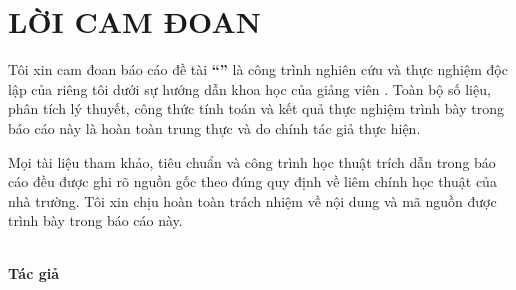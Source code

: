 \chapter*{LỜI CAM ĐOAN}

Tôi xin cam đoan báo cáo đề tài \textbf{``\ProjectTitle''} là công trình nghiên cứu và thực nghiệm độc lập của riêng tôi dưới sự hướng dẫn khoa học của giảng viên \textbf{\InstructorName}. Toàn bộ số liệu, phân tích lý thuyết, công thức tính toán và kết quả thực nghiệm trình bày trong báo cáo này là hoàn toàn trung thực và do chính tác giả thực hiện.

Mọi tài liệu tham khảo, tiêu chuẩn và công trình học thuật trích dẫn trong báo cáo đều được ghi rõ nguồn gốc theo đúng quy định về liêm chính học thuật của nhà trường. Tôi xin chịu hoàn toàn trách nhiệm về nội dung và mã nguồn được trình bày trong báo cáo này.

\vspace{1.5cm}
\begin{flushright}
    \textit{\LocationDate}\\[0.3cm]
    \textbf{Tác giả}\\[2cm]
    \textit{\StudentName}
\end{flushright}
